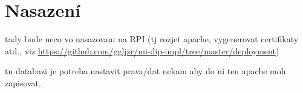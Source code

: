 \chapter{Nasazení}

tady bude neco vo nasazovani na RPI (tj rozjet apache, vygenerovat certifikaty atd., viz \url{https://github.com/ggljzr/mi-dip-impl/tree/master/deployment})

tu databazi je potreba nastavit prava/dat nekam aby do ni ten apache moh zapisovat.

\label{sec:dp}